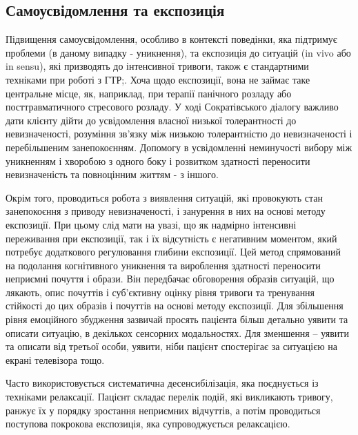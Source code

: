 \documentclass[twocolumn]{article}
\begin{document}
\subsection{Самоусвідомлення та експозиція}
\par Підвищення самоусвідомлення, особливо в контексті поведінки, яка підтримує проблеми (в даному випадку - уникнення), та експозиція до ситуацій (in vivo або in sensu), які призводять до інтенсивної тривоги, також є стандартними техніками при роботі з ГТР\cite{bib17};\cite{bib18}.  Хоча щодо експозиції, вона не займає таке центральне місце, як, наприклад, при терапії панічного розладу або посттравматичного стресового розладу. У ході Сократівського діалогу важливо дати клієнту дійти до усвідомлення власної низької толерантності до невизначеності, розуміння зв'язку між низькою толерантністю до невизначеності і перебільшеним занепокоєнням. Допомогу в усвідомленні неминучості вибору між уникненням і хворобою з одного боку і розвитком здатності переносити невизначеність та повноцінним життям - з іншого.
\par Окрім того, проводиться робота з виявлення ситуацій, які провокують стан занепокоєння з приводу невизначеності, і занурення в них на основі методу експозиції. При цьому слід мати на увазі, що як надмірно інтенсивні переживання при експозиції, так і їх відсутність є негативним моментом, який потребує додаткового регулювання глибини експозиції. Цей метод спрямований на подолання когнітивного уникнення та вироблення здатності переносити неприємні почуття і образи. Він передбачає обговорення образів ситуацій, що лякають, опис почуттів і суб'єктивну оцінку рівня тривоги та тренування стійкості до цих образів і почуттів на основі методу експозиції. Для збільшення рівня емоційного збудження зазвичай просять пацієнта більш детально уявити та описати ситуацію, в декількох сенсорних модальностях. Для зменшення – уявити та описати від третьої особи, уявити, ніби пацієнт спостерігає за ситуацією на екрані телевізора тощо.
\par Часто використовується систематична десенсибілізація, яка поєднується із техніками релаксації. Пацієнт складає перелік подій, які викликають тривогу, ранжує їх у порядку зростання неприємних відчуттів, а потім проводиться поступова покрокова експозиція, яка супроводжується релаксацією.
\end{document}
